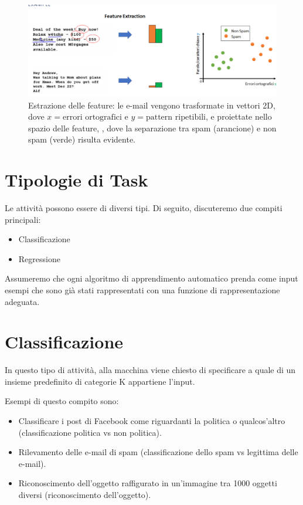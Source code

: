 \begin{figure}[htbp]
    \centering
    \includegraphics[width=\textwidth]{images/featureExtraction.png}
    \caption{Estrazione delle feature: le e-mail vengono trasformate in vettori 2D, dove $x = \text{errori ortografici e } y = \text{pattern ripetibili}$, e proiettate nello spazio delle feature, , dove la separazione tra spam (arancione) e non spam (verde) risulta evidente.}
    \label{fig:featureExtraction}
\end{figure}

\section{Tipologie di Task}

Le attività possono essere di diversi tipi. Di seguito, discuteremo due compiti principali:

\begin{itemize}
\item Classificazione
\item Regressione
\end{itemize}

Assumeremo che ogni algoritmo di apprendimento automatico prenda come input esempi che sono già stati rappresentati con una funzione di rappresentazione adeguata.

\section{Classificazione}

In questo tipo di attività, alla macchina viene chiesto di specificare a quale di un insieme predefinito di categorie K appartiene l'input.

\noindent
Esempi di questo compito sono:

\begin{itemize}
\item Classificare i post di Facebook come riguardanti la politica o qualcos'altro (classificazione politica vs non politica).
\item Rilevamento delle e-mail di spam (classificazione dello spam vs legittima delle e-mail).
\item Riconoscimento dell'oggetto raffigurato in un'immagine tra 1000 oggetti diversi (riconoscimento dell'oggetto).
\end{itemize}

